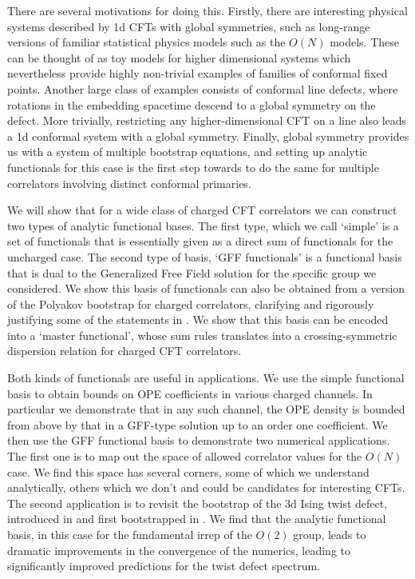 \documentclass[12pt]{article}
\numberwithin{equation}{section}
\begin{document}
	There are several motivations for doing this. Firstly, there are interesting physical systems described by 1d CFTs with global symmetries, such as long-range versions of familiar statistical physics models such as the $O(N)$ models. These can be thought of as toy models for higher dimensional systems which nevertheless provide highly non-trivial examples of families of conformal fixed points. Another large class of examples consists of conformal line defects, where rotations in the embedding spacetime descend to a global symmetry on the defect. More trivially, restricting any higher-dimensional CFT on a line also leads a 1d conformal system with a global symmetry. Finally, global symmetry provides us with a system of multiple bootstrap equations, and setting up analytic functionals for this case is the first step towards to do the same for multiple correlators involving distinct conformal primaries.

	 We will show that for a wide class of charged CFT correlators we can construct two types of analytic functional bases. The first type, which we call ‘simple’ is a set of functionals that is essentially given as a direct sum of functionals for the uncharged case. The second type of basis, ‘GFF functionals’ is a functional basis that is dual to the Generalized Free Field solution for the specific group we considered. We show this basis of functionals can also be obtained from a version of the Polyakov bootstrap for charged correlators, clarifying and rigorously justifying some of the statements in \cite{Ferrero:2019luz}. We show that this basis can be encoded into a `master functional', whose sum rules translates into a crossing-symmetric dispersion relation for charged CFT correlators.
	
	Both kinds of functionals are useful in applications. We use the simple functional basis to obtain bounds on OPE coefficients in various charged channels. In particular we demonstrate that in any such channel, the OPE density is bounded from above by that in a GFF-type solution up to an order one coefficient. We then use the GFF functional basis to demonstrate two numerical applications. The first one is to map out the space of allowed correlator values for the $O(N)$ case. We find this space has several corners, some of which we understand analytically, others which we don't and could be candidates for interesting CFTs. The second application is to revisit the bootstrap of the 3d Ising twist defect, introduced in \cite{Billo:2013jda} and first bootstrapped in \cite{Gaiotto:2013nva}. We find that the analytic functional basis, in this case for the fundamental irrep of the $O(2)$ group, leads to dramatic improvements in the convergence of the numerics, leading to significantly improved predictions for the twist defect spectrum. 
	
\end{document}
